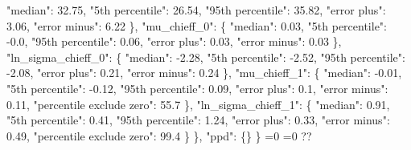 {{          "median": 32.75, %
          "5th percentile": 26.54, %
          "95th percentile": 35.82, %
          "error plus": 3.06, %
          "error minus": 6.22%
        \}, %
        "mu\_chieff\_0": \{%
          "median": 0.03, %
          "5th percentile": {-}0.0, %
          "95th percentile": 0.06, %
          "error plus": 0.03, %
          "error minus": 0.03%
        \}, %
        "ln\_sigma\_chieff\_0": \{%
          "median": {-}2.28, %
          "5th percentile": {-}2.52, %
          "95th percentile": {-}2.08, %
          "error plus": 0.21, %
          "error minus": 0.24%
        \}, %
        "mu\_chieff\_1": \{%
          "median": {-}0.01, %
          "5th percentile": {-}0.12, %
          "95th percentile": 0.09, %
          "error plus": 0.1, %
          "error minus": 0.11, %
          "percentile exclude zero": 55.7%
        \}, %
        "ln\_sigma\_chieff\_1": \{%
          "median": 0.91, %
          "5th percentile": 0.41, %
          "95th percentile": 1.24, %
          "error plus": 0.33, %
          "error minus": 0.49, %
          "percentile exclude zero": 99.4%
        \}%
      \}, %
      "ppd": \{\}%
    \}}%
  \else%
    \ifnum{}=0%
      \let\zchieffLinearCorrelationModel@out\zchieffLinearCorrelationModel@I%
    \else%
      \ifnum{}=0%
      \let\zchieffLinearCorrelationModel@out\zchieffLinearCorrelationModel@II%
    \else%
      \def\zchieffLinearCorrelationModel@out{%
    ??}%
    \fi\fi
  \fi
  \zchieffLinearCorrelationModel@out
}\newcommand\zchieffLinearCorrelationModel@I[1][all]{%
  \ifnum\pdfstrcmp{#1}{all}=0%
    \def\zchieffLinearCorrelationModel@I@out{%
    \{%
      "alpha\_1": \{%
        "median": 1.77, %
        "5th percentile": {-}0.34, %
        "95th percentile": 3.19, %
        "error plus": 1.42, %
        "error minus": 2.11%
      \}, %
      "alpha\_2": \{%
        "median": 4.63, %
        "5th percentile": 3.26, %
        "95th percentile": 6.34, %
        "error plus": 1.71, %
        "error minus": 1.37%
      \}, %
      "beta": \{%
        "median": 1.46, %
        "5th percentile": 0.3, %
        "95th percentile": 3.05, %
        "error plus": 1.59, %
        "error minus": 1.16%
      \}, %
      "break\_mass": \{%
        "median": 34.57, %
        "5th percentile": 21.64, %
        "95th percentile": 47.76, %
        "error plus": 13.19, %
        "error minus": 12.93%
      \}, %
      "delta\_m\_1": \{%
        "median": 4.61, %
        "5th percentile": 0.45, %
        "95th percentile": 9.4, %
        "error plus": 4.79, %
        "error minus": 4.16%
}}

